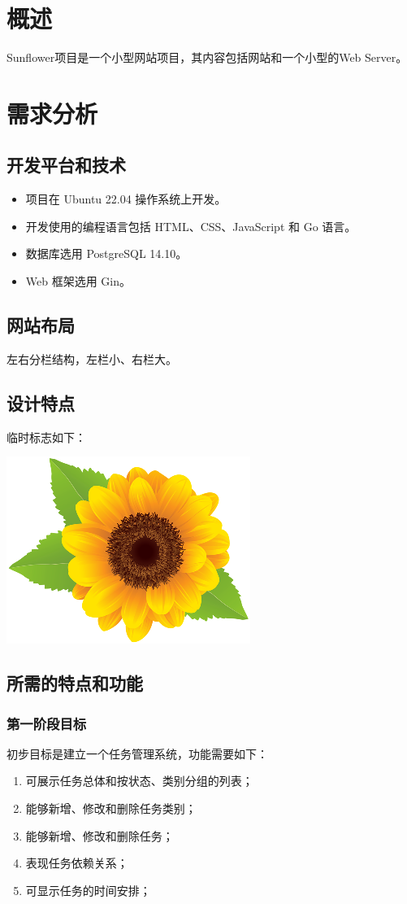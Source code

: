 \chapter{概述}
Sunflower项目是一个小型网站项目，其内容包括网站和一个小型的Web Server。


\chapter{需求分析}


\section{开发平台和技术}
\begin{itemize}
  \item 项目在 Ubuntu 22.04 操作系统上开发。
  \item 开发使用的编程语言包括 HTML、CSS、JavaScript 和 Go 语言。
  \item 数据库选用 PostgreSQL 14.10。
  \item Web 框架选用 Gin。
\end{itemize}


\section{网站布局}
左右分栏结构，左栏小、右栏大。


\section{设计特点}
临时标志如下：
\begin{center}
  \includegraphics[width=.3\textwidth]{images/logo.png}
\end{center}


\section{所需的特点和功能}


\subsection{第一阶段目标}
初步目标是建立一个任务管理系统，功能需要如下：
\begin{enumerate}
  \item 可展示任务总体和按状态、类别分组的列表；
  \item 能够新增、修改和删除任务类别；
  \item 能够新增、修改和删除任务；
  \item 表现任务依赖关系；
  \item 可显示任务的时间安排；
\end{enumerate}


